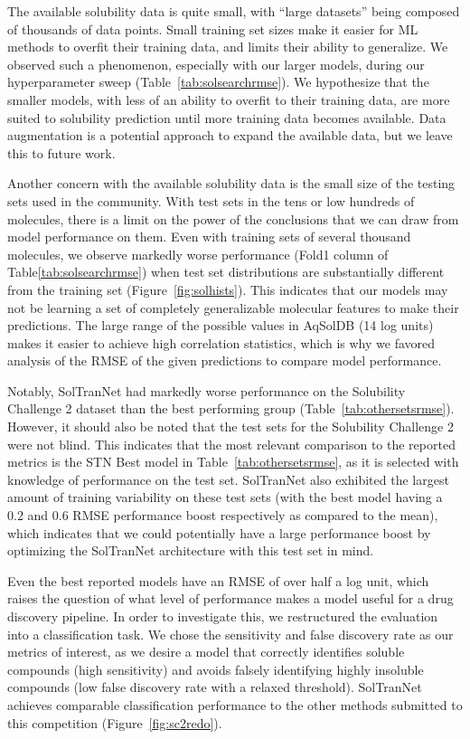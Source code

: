\documentclass[journal=jmcmar,manuscript=article]{achemso}
\begin{document}
The available solubility data is quite small, with ``large datasets'' being composed of thousands of data points.
Small training set sizes make it easier for ML methods to overfit their training data, and limits their ability to generalize.
We observed such a phenomenon, especially with our larger models, during our hyperparameter sweep (Table~\ref{tab:solsearchrmse}).
We hypothesize that the smaller models, with less of an ability to overfit to their training data, are more suited to solubility prediction until more training data becomes available.
Data augmentation is a potential approach to expand the available data, but we leave this to future work.

Another concern with the available solubility data is the small size of the testing sets used in the community.
With test sets in the tens or low hundreds of molecules, there is a limit on the power of the conclusions that we can draw from model performance on them.
Even with training sets of several thousand molecules, we observe markedly worse performance (Fold1 column of Table\ref{tab:solsearchrmse}) when test set distributions are substantially different from the training set (Figure~\ref{fig:solhists}).
This indicates that our models may not be learning a set of completely generalizable molecular features to make their predictions.
The large range of the possible values in AqSolDB (14 log units) makes it easier to achieve high correlation statistics, which is why we favored analysis of the RMSE of the given predictions to compare model performance.

Notably, SolTranNet had markedly worse performance on the Solubility Challenge 2 dataset than the best performing group (Table~\ref{tab:othersetsrmse}).
However, it should also be noted that the test sets for the Solubility Challenge 2 were not blind.
This indicates that the most relevant comparison to the reported metrics is the STN Best model in Table~\ref{tab:othersetsrmse}, as it is selected with knowledge of performance on the test set.
SolTranNet also exhibited the largest amount of training variability on these test sets (with the best model having a 0.2 and 0.6 RMSE performance boost respectively as compared to the mean), which indicates that we could potentially have a large performance boost by optimizing the SolTranNet architecture with this test set in mind.

Even the best reported models have an RMSE of over half a log unit, which raises the question of what level of performance makes a model useful for a drug discovery pipeline.
In order to investigate this, we restructured the evaluation into a classification task.
We chose the sensitivity and false discovery rate as our metrics of interest, as we desire a model that correctly identifies soluble compounds (high sensitivity) and avoids falsely identifying highly insoluble compounds (low false discovery rate with a relaxed threshold).
SolTranNet achieves comparable classification performance to the other methods submitted to this competition (Figure~\ref{fig:sc2redo}).
\end{document}
